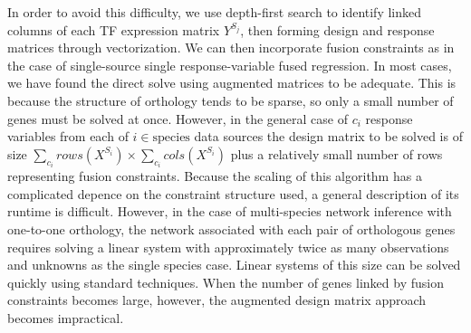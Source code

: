 \documentclass[11pt]{article}
\begin{document}
In order to avoid this difficulty, we use depth-first search to identify linked columns of each TF expression matrix $Y^{S_j}$, then forming design and response matrices through vectorization. We can then incorporate fusion constraints as in the case of single-source single response-variable fused regression. In most cases, we have found the direct solve using augmented matrices to be adequate. This is because the structure of orthology tends to be sparse, so only a small number of genes must be solved at once. However, in the general case of $c_i$ response variables from each of $i \in \text{species}$ data sources the design matrix to be solved is of size $\displaystyle \sum_{c_i} rows(X^{S_i}) \times \displaystyle \sum_{c_i} cols(X^{S_i})$ plus a relatively small number of rows representing fusion constraints. Because the scaling of this algorithm has a complicated depence on the constraint structure used, a general description of its runtime is difficult. However, in the case of multi-species network inference with one-to-one orthology, the network associated with each pair of orthologous genes requires solving a linear system with approximately twice as many observations and unknowns as the single species case. Linear systems of this size can be solved quickly using standard techniques. When the number of genes linked by fusion constraints becomes large, however, the augmented design matrix approach becomes impractical.


\end{document}
